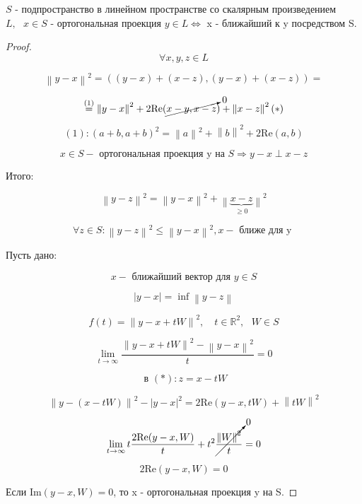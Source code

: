 \documentclass[12pt, a4paper]{report}
\begin{document}
\begin{lemma}
    \( S  \)  - подпространство в линейном пространстве со скалярным произведением \( L, \text{ }  x \in  S  \)  - ортогональная проекция \(  y \in  L  \Leftrightarrow   \)   x - ближайший к y посредством S.
\end{lemma}

\begin{proof}
    
    \[ \forall  x, y , z \in  L \] 

    \[ \left\lVert  y - x  \right\rVert ^2  = ((y -x )+ (x- z ), (y -x) + ( x - z)) =   \] 
    
    \[ \overset{(1)}{=} \left\lVert y -x    \right\rVert ^2 + 2 \mathrm{Re }( \cancelto{0 }{x- y , x -z }) + \left\lVert x -z  \right\rVert ^2 (* ) \] 

    \[ (1): (a+b, a+ b ) ^2  = \left\lVert  a  \right\rVert ^2 + \left\lVert  b  \right\rVert ^2 + 2 \mathrm{Re } ( a,b ) \] 

    \[ x \in  S - \text{ ортогональная проекция y  на }  S \Rightarrow y -x \perp  x-z   \]  

    Итого: 

    \[ \left\lVert  y -z  \right\rVert ^2 = \left\lVert  y -x  \right\rVert ^2 + \underset{\geq 0 }{\left\lVert \underbrace{ x- z}  \right\rVert }^2  \] 

    \[ \forall  z \in  S : \left\lVert  y -z  \right\rVert ^2 \le  \left\lVert  y -x  \right\rVert ^2 , x - \text{ ближе для y }  \] 

    Пусть дано: 

    \[ x - \text{ ближайший вектор для  } y \in S   \] 

    \[ \left\lvert y -x  \right\rvert = \inf \left\lVert  y -z \right\rVert \] 

    \[ f(t )  = \left\lVert  y -x + t W  \right\rVert ^2, \quad  t \in  \mathbb{R}  ^2 , \text{ }  W \in S \]  

    \[ \lim_{t  \to \infty}  \frac{ \left\lVert y -x + t W  \right\rVert ^2 - \left\lVert  y -x  \right\rVert ^2 } {t } = 0   \] 

    \[ \text{ в } (* ): z = x - t W  \]
    
    \[ \left\lVert y - (x - tW ) \right\rVert  ^2 - \left\lvert y -x  \right\rvert  ^2 = 2 \mathrm{Re } (y - x, t W ) + \left\lVert t W  \right\rVert ^2   \] 

    \[ \lim_{t  \to \infty}    t\frac{2 \mathrm{Re } (y - x , W ) }{ t } + t ^2         \cancelto{0 }{ \frac{\left\lVert W  \right\rVert ^2 }{t } } = 0      \] 

    \[ 2 \mathrm{Re }  ( y - x, W )  = 0  \] 

    Если \( \mathrm{Im } ( y -x , W ) = 0 \), то x - ортогональная проекция y на S.

\end{proof}
\end{document}
